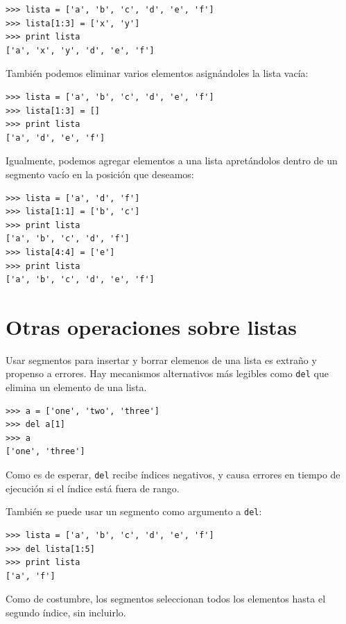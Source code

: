 \beforeverb
\begin{verbatim}
>>> lista = ['a', 'b', 'c', 'd', 'e', 'f']
>>> lista[1:3] = ['x', 'y']
>>> print lista
['a', 'x', 'y', 'd', 'e', 'f']
\end{verbatim}
\afterverb
%
También podemos eliminar varios elementos asignándoles la lista 
vacía:

\beforeverb
\begin{verbatim}
>>> lista = ['a', 'b', 'c', 'd', 'e', 'f']
>>> lista[1:3] = []
>>> print lista
['a', 'd', 'e', 'f']
\end{verbatim}
\afterverb
%

Igualmente, podemos agregar elementos a una lista apretándolos dentro
de un segmento vacío en la posición que deseamos:

\beforeverb
\begin{verbatim}
>>> lista = ['a', 'd', 'f']
>>> lista[1:1] = ['b', 'c']
>>> print lista
['a', 'b', 'c', 'd', 'f']
>>> lista[4:4] = ['e']
>>> print lista
['a', 'b', 'c', 'd', 'e', 'f']
\end{verbatim}
\afterverb
%

\section{Otras operaciones sobre listas}

Usar segmentos para insertar y borrar elemenos de una lista es extraño 
y propenso a errores. Hay mecanismos alternativos más legibles como 
\texttt{del} que elimina un elemento de una lista.


\beforeverb
\begin{verbatim}
>>> a = ['one', 'two', 'three']
>>> del a[1]
>>> a
['one', 'three']
\end{verbatim}
\afterverb
%
Como es de esperar, \texttt{del} recibe índices  negativos, y 
causa errores en tiempo de ejecución si el índice está
fuera de rango.

También se puede usar un segmento como argumento a \texttt{del}:

\beforeverb
\begin{verbatim}
>>> lista = ['a', 'b', 'c', 'd', 'e', 'f']
>>> del lista[1:5]
>>> print lista
['a', 'f']
\end{verbatim}
\afterverb
%
Como de costumbre, los segmentos seleccionan todos los elementos
hasta el segundo índice, sin incluirlo.

